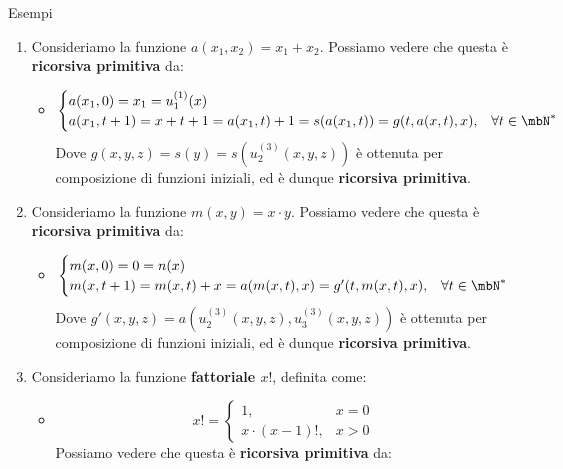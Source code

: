\begin{generalbox}[colframe=azure-gradient-3!90!black]{Esempi}
  \begin{enumerate}
    \item Consideriamo la funzione \(a(x_1,x_2) = x_1+x_2\). Possiamo vedere che questa è \textbf{ricorsiva primitiva} da:
    \begin{itemize}
      \item []
      \begin{equation}
        \begin{cases}
          a(x_1,0)=x_1=u_1^{(1)}(x)\\
          a(x_1,t+1)=x+t+1=a(x_1,t)+1=s(a(x_1,t))=g(t, a(x,t),x), & \forall t \in \mbN^*
        \end{cases}
      \end{equation}
      Dove \(g(x,y,z)=s(y)=s(u_2^{(3)}(x,y,z))\) è ottenuta per composizione di funzioni iniziali, ed è dunque \textbf{ricorsiva primitiva}.
    \end{itemize}
    \item Consideriamo la funzione \(m(x,y)=x\cdot y\). Possiamo vedere che questa è \textbf{ricorsiva primitiva} da:
    \begin{itemize}
     \item []
      \begin{equation}
        \begin{cases}
          m(x,0)=0=n(x)\\
          m(x, t+1)=m(x, t)+x=a(m(x,t),x)=g'(t, m(x, t),x), & \forall t \in \mbN^*
        \end{cases}
      \end{equation}
      Dove \(g'(x,y,z)=a(u_2^{(3)}(x,y,z),u_3^{(3)}(x,y,z))\) è ottenuta per composizione di funzioni iniziali, ed è dunque \textbf{ricorsiva primitiva}.
    \end{itemize}
    \item Consideriamo la funzione \textbf{fattoriale \(x!\)}, definita come: %
    \begin{itemize}
      \item []
      \begin{equation}
        x! =\begin{cases}
              1, & x=0\\
              x\cdot (x-1)!,&  x>0
            \end{cases}
      \end{equation}
      Possiamo vedere che questa è \textbf{ricorsiva primitiva} da:
      \begin{equation}

\end{equation}
\end{itemize}
\end{enumerate}
\end{generalbox}
